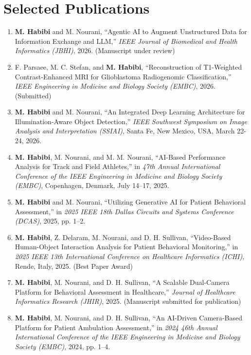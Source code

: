 \documentclass[10pt,a4paper,sans]{moderncv}
\begin{document}
\section{Selected Publications}
\begin{enumerate}

    \item \textbf{M. Habibi} and M. Nourani, ``Agentic AI to Augment Unstructured Data for Information Exchange and LLM,'' \textit{IEEE Journal of Biomedical and Health Informatics (JBHI)}, 2026. (Manuscript under review)

    \item F. Parsaee, M. C. Stefan, and \textbf{M. Habibi}, ``Reconstruction of T1-Weighted Contrast-Enhanced MRI for Glioblastoma Radiogenomic Classification,'' \textit{IEEE Engineering in Medicine and Biology Society (EMBC)}, 2026. (Submitted)

    \item \textbf{M. Habibi} and M. Nourani, ``An Integrated Deep Learning Architecture for Illumination-Aware Object Detection,'' \textit{IEEE Southwest Symposium on Image Analysis and Interpretation (SSIAI)}, Santa Fe, New Mexico, USA, March 22-24, 2026.

    \item \textbf{M. Habibi}, M. Nourani, and M. M. Nourani, ``AI-Based Performance Analysis for Track and Field Athletes,'' in \textit{47th Annual International Conference of the IEEE Engineering in Medicine and Biology Society (EMBC)}, Copenhagen, Denmark, July 14--17, 2025.

    \item \textbf{M. Habibi} and M. Nourani, ``Utilizing Generative AI for Patient Behavioral Assessment,'' in \textit{2025 IEEE 18th Dallas Circuits and Systems Conference (DCAS)}, 2025, pp. 1--2.

    \item \textbf{M. Habibi}, Z. Delaram, M. Nourani, and D. H. Sullivan, ``Video-Based Human-Object Interaction Analysis for Patient Behavioral Monitoring,'' in \textit{2025 IEEE 13th International Conference on Healthcare Informatics (ICHI)}, Rende, Italy, 2025. (Best Paper Award)

    \item \textbf{M. Habibi}, M. Nourani, and D. H. Sullivan, ``A Scalable Dual-Camera Platform for Behavioral Assessment in Healthcare,'' \textit{Journal of Healthcare Informatics Research (JHIR)}, 2025. (Manuscript submitted for publication)

    \item \textbf{M. Habibi}, M. Nourani, and D. H. Sullivan, ``An AI-Driven Camera-Based Platform for Patient Ambulation Assessment,'' in \textit{2024 46th Annual International Conference of the IEEE Engineering in Medicine and Biology Society (EMBC)}, 2024, pp. 1--4.


\end{enumerate}
\end{document}
